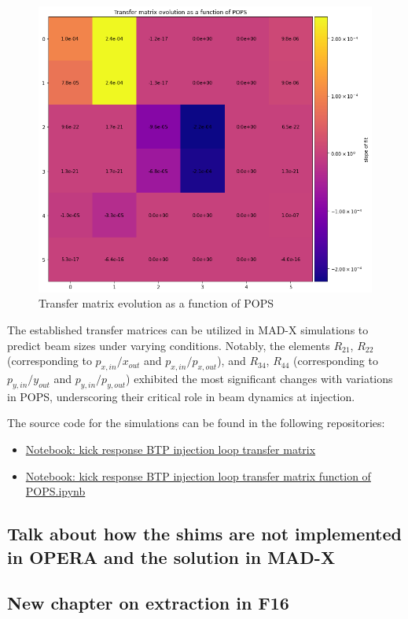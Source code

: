 \begin{figure}[H]
\centering
\includegraphics[width=1.0\textwidth]{02_Simulation/images/transfer_matrix_POPS.png}
\caption{Transfer matrix evolution as a function of POPS}
\label{fig:transfer_matrix_pops}
\end{figure}

The established transfer matrices can be utilized in MAD-X simulations to predict beam sizes under varying conditions. Notably, the elements \(R_{21}\), \(R_{22}\) (corresponding to \(p_{x,in}/x_{out}\) and \(p_{x,in}/p_{x,out}\)), and \(R_{34}\), \(R_{44}\) (corresponding to \(p_{y,in}/y_{out}\) and \(p_{y,in}/p_{y,out}\)) exhibited the most significant changes with variations in POPS, underscoring their critical role in beam dynamics at injection.


The source code for the simulations can be found in the following repositories:
\begin{itemize}
  \item \href{https://gitlab.cern.ch/eljohnso/acc-models-tls-eliott-fork/-/blob/EliottBranch/ps_injection/kick_response_injection_tracking/kick_response_BTP_injection_loop_transfer_matrix.ipynb}{Notebook: kick response BTP injection loop transfer matrix}
  \item \href{https://gitlab.cern.ch/eljohnso/acc-models-tls-eliott-fork/-/blob/EliottBranch/ps_injection/kick_response_injection_tracking/kick_response_BTP_injection_loop_transfer_matrix_function_of_POPS.ipynb}{Notebook: kick response BTP injection loop transfer matrix function of POPS.ipynb}
\end{itemize}


\subsection{Talk about how the shims are not implemented in OPERA and the solution in MAD-X}

\subsection{New chapter on extraction in F16}